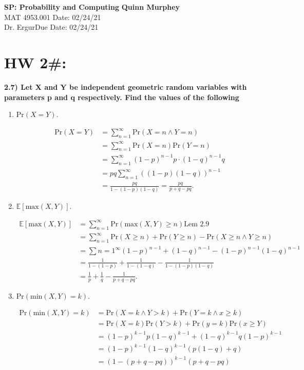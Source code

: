\documentclass[letterpaper, 12pt]{article}
\begin{document}
\noindent
\large\textbf{SP: Probability and Computing} \hfill \textbf{Quinn Murphey} \\
\normalsize MAT 4953.001 \hfill Date: 02/24/21\\
Dr. Ergur\hfill Due Date: 02/24/21\\
\noindent\makebox[\linewidth]{\rule{\paperwidth}{0.4pt}}


\section*{HW 2\#:}
	\noindent\textbf{2.7) Let X and Y be independent geometric random variables with parameters p and q respectively. Find the values of the following}
	\begin{enumerate}
		\item Pr$(X = Y)$.

			\begin{align*}
				\text{Pr}(X=Y) &= \sum_{n=1}^\infty \text{Pr}(X=n \land Y=n) \\
				&= \sum_{n=1}^\infty \text{Pr}(X=n)\text{Pr}(Y=n) \\
				&= \sum_{n=1}^\infty (1-p)^{n-1}p\cdot(1-q)^{n-1}q \\
				&= pq\sum_{n=1}^\infty ((1-p)(1-q))^{n-1} \\
				&= \frac{pq}{1 - (1-p)(1-q)} = \frac{pq}{p + q - pq}.
			\end{align*}

		\item $\mathbb{E}[\text{max}(X,Y)]$.

			\begin{align*}
				\mathbb{E}[\text{max}(X,Y)] &= \sum_{n=1}^\infty \text{Pr}(\text{max}(X,Y)\geq n) \text{Lem 2.9} \\
				&= \sum_{n=1}^\infty \text{Pr}(X\geq n) + \text{Pr}(Y\geq n) - \text{Pr}(X\geq n \land Y\geq n) \\
				&= \sum{n=1}^\infty (1-p)^{n-1} + (1-q)^{n-1} - (1-p)^{n-1}(1-q)^{n-1} \\
				&= \frac{1}{1 - (1-p)} + \frac{1}{1 - (1-q)} - \frac{1}{1 - (1-p)(1-q)} \\
				&= \frac{1}{p} + \frac{1}{q} - \frac{1}{p + q - pq}.
			\end{align*}
			
		\item Pr$(\text{min}(X,Y) = k)$.

			\begin{align*}
				\text{Pr}(\text{min}(X,Y) = k) &= \text{Pr}(X = k \land Y>k) + \text{Pr}(Y = k \land x \geq k) \\
				&= \text{Pr}(X=k)\text{Pr}(Y>k) + \text{Pr}(y=k)\text{Pr}(x\geq Y) \\
				&= (1-p)^{k-1}p(1-q)^{k-1} + (1-q)^{k-1}q(1-p)^{k-1}\\
				&= (1-p)^{k-1}(1-q)^{k-1}(p(1-q) + q) \\
				&= (1 - (p + q - pq))^{k-1}(p + q -pq)
			\end{align*}


\end{enumerate}
\end{document}
